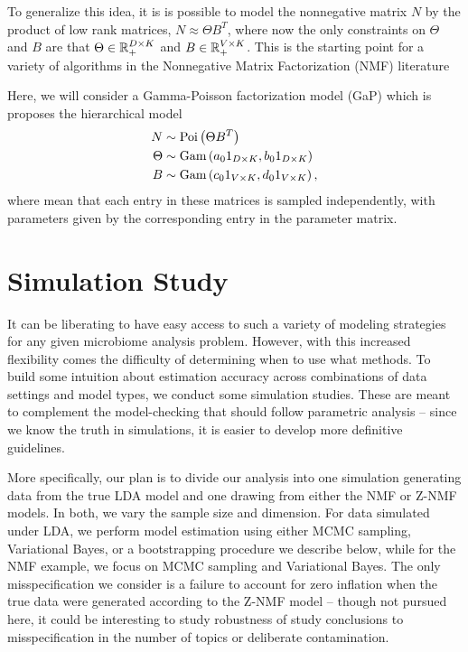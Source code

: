\documentclass[oupdraft]{bio}
\begin{document}
To generalize this idea, it is is possible to model the nonnegative matrix $N$
by the product of low rank matrices, $N \approx \Theta B^{T}$, where now the
only constraints on $\Theta$ and $B$ are that $\Theta \in \mathbb{R}_{+}^{D \times
  K}$ and $B \in \mathbb{R}_{+}^{V \times K}$. This is the starting point for a
variety of algorithms in the Nonnegative Matrix Factorization (NMF) literature
\citep{wang2013nonnegative, berry2007algorithms, lee2001algorithms}

Here, we will consider a Gamma-Poisson factorization model (GaP)
\citep{kucukelbir2015automatic, canny2004gap} which is proposes the hierarchical
model
\begin{align*}
N &\sim \textnormal{Poi}\left(\Theta B^{T}\right) \\
\Theta &\sim \textnormal{Gam}\left(a_{0} 1_{D \times K}, b_{0} 1_{D \times K}\right) \\
B &\sim \textnormal{Gam}\left(c_{0} 1_{V \times K}, d_{0} 1_{V \times K} \right),
\end{align*}
where mean that each entry in these matrices is sampled independently, with
parameters given by the corresponding entry in the parameter matrix.

\section{Simulation Study}

It can be liberating to have easy access to such a variety of modeling
strategies for any given microbiome analysis problem. However, with this
increased flexibility comes the difficulty of determining when to use what
methods. To build some intuition about estimation accuracy across combinations
of data settings and model types, we conduct some simulation studies. These are
meant to complement the model-checking that should follow parametric analysis --
since we know the truth in simulations, it is easier to develop more definitive
guidelines.

More specifically, our plan is to divide our analysis into one simulation
generating data from the true LDA model and one drawing from either the NMF or
Z-NMF models. In both, we vary the sample size and dimension. For data simulated
under LDA, we perform model estimation using either MCMC sampling, Variational
Bayes, or a bootstrapping procedure we describe below, while for the NMF
example, we focus on MCMC sampling and Variational Bayes. The only
misspecification we consider is a failure to account for zero inflation when the
true data were generated according to the Z-NMF model -- though not pursued
here, it could be interesting to study robustness of study conclusions to
misspecification in the number of topics or deliberate contamination.
\end{document}
